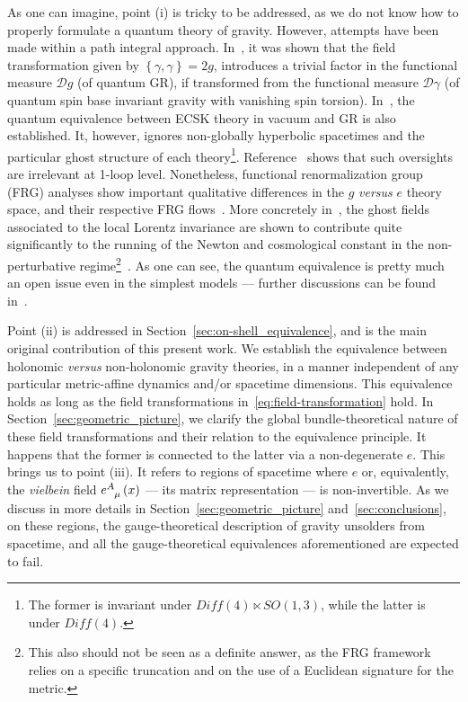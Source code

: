 \documentclass[../../main.tex]{subfiles}
\begin{document}
As one can imagine, point (i) is tricky to be addressed, as we do not know how to properly formulate a quantum theory of gravity. However, attempts have been made within a path integral approach. In~\cite{lippoldt2014}, it was shown that the field transformation given by $\left\{\gamma,\gamma\right\}=2g$, introduces a trivial factor in the functional measure $\mathcal{D}g$ (of quantum GR), if transformed from the functional measure $\mathcal{D}\gamma$ (of quantum spin base invariant gravity with vanishing spin torsion). In~\cite{zanelli2003}, the quantum equivalence between ECSK theory in vacuum and GR is also established. It, however, ignores non-globally hyperbolic spacetimes and the particular ghost structure of each theory\footnote{The former is invariant under $Diff(4) \ltimes SO(1,3)$, while the latter is under $Diff(4)$.}. Reference~\cite{dario2011} shows that such oversights are irrelevant at 1-loop level. Nonetheless, functional renormalization group (FRG) analyses show important qualitative differences in the $g$ \textit{versus} $e$ theory space, and their respective FRG flows~\cite{reuter2010}. More concretely in~\cite{reuter2012}, the ghost fields associated to the local Lorentz invariance are shown to contribute quite significantly to the running of the Newton and cosmological constant in the non-perturbative regime\footnote{This also should not be seen as a definite answer, as the FRG framework relies on a specific truncation and on the use of a Euclidean signature for the metric.}~\cite{reuter2012}. As one can see, the quantum equivalence is pretty much an open issue even in the simplest models --- further discussions can be found in~\cite{reuter2013,reuter2015,reuter2016}.

Point (ii) is addressed in Section~\ref{sec:on-shell_equivalence}, and is the main original contribution of this present work. We establish the equivalence between holonomic \textit{versus} non-holonomic gravity theories, in a manner independent of any particular metric-affine dynamics and/or spacetime dimensions. This equivalence holds as long as the field transformations in~\eqref{eq:field-transformation} hold. In Section~\ref{sec:geometric_picture}, we clarify the global bundle-theoretical nature of these field transformations and their relation to the equivalence principle. It happens that the former is connected to the latter via a non-degenerate $e$. This brings us to point (iii). It refers to regions of spacetime where $e$ or, equivalently, the \textit{vielbein} field $\tensor{e}{^A_\mu}\left(x\right)$ --- its matrix representation --- is non-invertible. As we discuss in more details in Section~\ref{sec:geometric_picture} and~\ref{sec:conclusions}, on these regions, the gauge-theoretical description of gravity unsolders from spacetime, and all the gauge-theoretical equivalences aforementioned are expected to fail.
\end{document}
